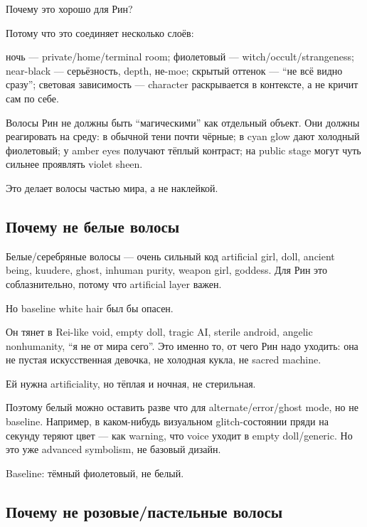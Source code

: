 Почему это хорошо для Рин?

Потому что это соединяет несколько слоёв:

ночь --- private/\hspace{0pt}home/\hspace{0pt}terminal room; фиолетовый ---
witch/\hspace{0pt}occult/\hspace{0pt}strangeness; near-black --- серьёзность, depth, не-moe;
скрытый оттенок --- ``не всё видно сразу''; световая зависимость ---
character раскрывается в контексте, а не кричит сам по себе.

Волосы Рин не должны быть ``магическими'' как отдельный объект. Они
должны реагировать на среду: в обычной тени почти чёрные; в cyan glow
дают холодный фиолетовый; у amber eyes получают тёплый контраст; на
public stage могут чуть сильнее проявлять violet sheen.

Это делает волосы частью мира, а не наклейкой.

\subsection*{Почему не белые волосы}

Белые/\hspace{0pt}серебряные волосы --- очень сильный код artificial girl, doll,
ancient being, kuudere, ghost, inhuman purity, weapon girl, goddess. Для
Рин это соблазнительно, потому что artificial layer важен.

Но baseline white hair был бы опасен.

Он тянет в Rei-like void, empty doll, tragic AI, sterile android,
angelic nonhumanity, ``я не от мира сего''. Это именно то, от чего Рин
надо уходить: она не пустая искусственная девочка, не холодная кукла, не
sacred machine.

Ей нужна artificiality, но тёплая и ночная, не стерильная.

Поэтому белый можно оставить разве что для alternate/\hspace{0pt}error/\hspace{0pt}ghost mode,
но не baseline. Например, в каком-нибудь визуальном glitch-состоянии
пряди на секунду теряют цвет --- как warning, что voice уходит в empty
doll/\hspace{0pt}generic. Но это уже advanced symbolism, не базовый дизайн.

Baseline: тёмный фиолетовый, не белый.

\subsection*{Почему не розовые/\hspace{0pt}пастельные волосы}

